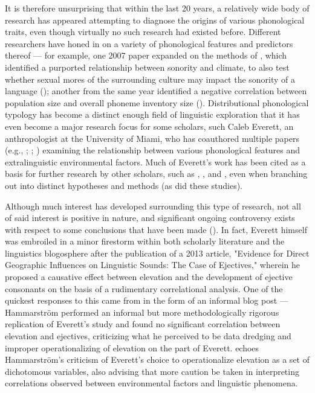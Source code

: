 \documentclass{article}
\begin{document}
It is therefore unsurprising that within the last 20 years, a relatively wide body of research has appeared attempting to diagnose the origins of various phonological traits, even though virtually no such research had existed before. Different researchers have honed in on a variety of phonological features and predictors thereof — for example, one 2007 paper expanded on the methods of \textcite{fought2004}, which identified a purported relationship between sonority and climate, to also test whether sexual mores of the surrounding culture may impact the sonority of a language (\cite{ember2007}); another from the same year identified a negative correlation between population size and overall phoneme inventory size (\cite{hay2007}). Distributional phonological typology has become a distinct enough field of linguistic exploration that it has even become a major research focus for some scholars, such Caleb Everett, an anthropologist at the University of Miami, who has coauthored multiple papers (e.g., \cite{everett2013}; \cite{everett2015}; \cite{everett2016}) examining the relationship between various phonological features and extralinguistic environmental factors. Much of Everett's work has been cited as a basis for further research by other scholars, such as \textcite{bentz2018}, \textcite{dediu2017}, and \textcite{noelle2020}, even when branching out into distinct hypotheses and methods (as did these studies).

Although much interest has developed surrounding this type of research, not all of said interest is positive in nature, and significant ongoing controversy exists with respect to some conclusions that have been made (\cite{ladd2015}). In fact, Everett himself was embroiled in a minor firestorm within both scholarly literature and the linguistics blogosphere after the publication of a 2013 article, "Evidence for Direct Geographic Influences on Linguistic Sounds: The Case of Ejectives," wherein he proposed a causative effect between elevation and the development of ejective consonants on the basis of a rudimentary correlational analysis. One of the quickest responses to this came from \cite{hammarstroem2013} in the form of an informal blog post — Hammarström performed an informal but more methodologically rigorous replication of Everett's study and found no significant correlation between elevation and ejectives, criticizing what he perceived to be data dredging and improper operationalizing of elevation on the part of Everett. \textcite{haynie2014} echoes Hammarström's criticism of Everett's choice to operationalize elevation as a set of dichotomous variables, also advising that more caution be taken in interpreting correlations observed between environmental factors and linguistic phenomena.
\end{document}
